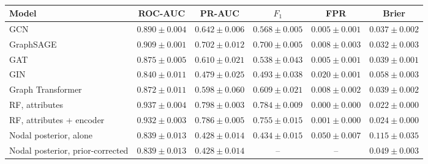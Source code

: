 \begin{table}[t]
\caption{}
\label{tab:elliptic}
\centering
\footnotesize
\renewcommand{\arraystretch}{1.12}
\begin{tabular}{p{2.2cm}ccccc}
\toprule
Model & ROC-AUC & PR-AUC & $F_1$ & FPR & Brier\\
\midrule
GCN & $0.890\pm0.004$ & $0.642\pm0.006$ & $0.568\pm0.005$ & $0.005\pm0.001$ & $0.037\pm0.002$\\
GraphSAGE & $0.909\pm0.001$ & $0.702\pm0.012$ & $0.700\pm0.005$ & $0.008\pm0.003$ & $0.032\pm0.003$\\
GAT & $0.875\pm0.005$ & $0.610\pm0.021$ & $0.538\pm0.043$ & $0.005\pm0.001$ & $0.039\pm0.001$\\
GIN & $0.840\pm0.011$ & $0.479\pm0.025$ & $0.493\pm0.038$ & $0.020\pm0.001$ & $0.058\pm0.003$\\
Graph Transformer & $0.872\pm0.011$ & $0.598\pm0.060$ & $0.609\pm0.021$ & $0.008\pm0.002$ & $0.039\pm0.002$\\
\midrule
RF, attributes & $0.937\pm0.004$ & $0.798\pm0.003$ & $0.784\pm0.009$ & $0.000\pm0.000$ & $0.022\pm0.000$\\
RF, attributes + encoder & $0.932\pm0.003$ & $0.786\pm0.005$ & $0.755\pm0.015$ & $0.001\pm0.000$ & $0.024\pm0.000$\\
Nodal posterior, alone & $0.839\pm0.013$ & $0.428\pm0.014$ & $0.434\pm0.015$ & $0.050\pm0.007$ & $0.115\pm0.035$\\
Nodal posterior, prior-corrected & $0.839\pm0.013$ & $0.428\pm0.014$ & -- & -- & $0.049\pm0.003$\\
\bottomrule
\end{tabular}
\end{table}